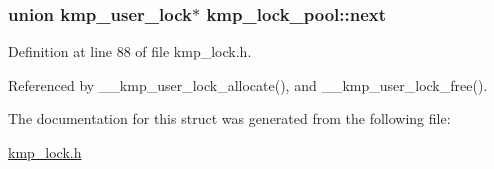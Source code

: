 \hypertarget{structkmp__lock__pool_af643d9132f2383574cec0a390a215014}{
\subsubsection[{next}]{\setlength{\rightskip}{0pt plus 5cm}union {\bf kmp\-\_\-user\-\_\-lock}$\ast$ kmp\-\_\-lock\-\_\-pool\-::next}}\label{structkmp__lock__pool_af643d9132f2383574cec0a390a215014}


Definition at line 88 of file kmp\-\_\-lock.\-h.



Referenced by \-\_\-\-\_\-kmp\-\_\-user\-\_\-lock\-\_\-allocate(), and \-\_\-\-\_\-kmp\-\_\-user\-\_\-lock\-\_\-free().



The documentation for this struct was generated from the following file\-:\begin{DoxyCompactItemize}
\item 
\hyperlink{kmp__lock_8h}{kmp\-\_\-lock.\-h}\end{DoxyCompactItemize}
